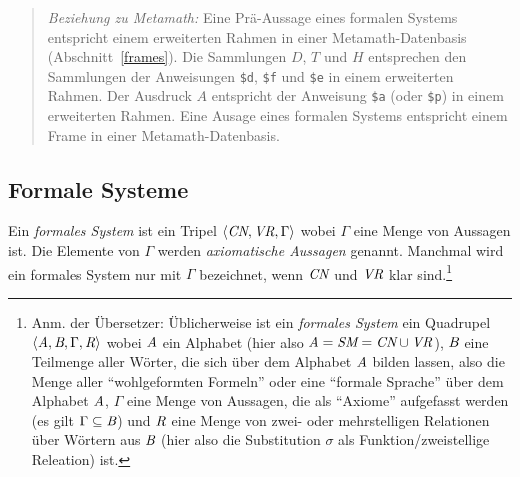 {\footnotesize\begin{quotation}
{\em Beziehung zu Metamath:} Eine Prä-Aussage eines formalen Systems entspricht einem erweiterten Rahmen in einer Metamath-Datenbasis (Abschnitt~\ref{frames}).  Die Sammlungen $D$, $T$ und $H$ entsprechen den Sammlungen der Anweisungen \texttt{\$d}, \texttt{\$f} und \texttt{\$e} in einem erweiterten Rahmen.  Der Ausdruck $A$ entspricht der Anweisung \texttt{\$a} (oder \texttt{\$p}) in einem erweiterten Rahmen.  Eine Ausage eines formalen Systems entspricht einem Frame in einer Metamath-Datenbasis.
\end{quotation}}

\subsection{Formale Systeme}

Ein {\em formales System} ist ein Tripel $\langle \mbox{\em CN},\mbox{\em VR},\Gamma\rangle$ wobei $\Gamma$ eine Menge von Aussagen ist.  Die Elemente von $\Gamma$ werden {\em axiomatische Aussagen} genannt.  Manchmal wird ein formales System nur mit $\Gamma$ bezeichnet, wenn $\mbox{\em CN}$ und $\mbox{\em VR}$ klar sind.\footnote{Anm. der Übersetzer: Üblicherweise ist ein {\em formales System} ein Quadrupel $\langle \mbox{\em A},\mbox{\em B},\Gamma,\mbox{\em R}\rangle$
wobei $\mbox{\em A}$ ein Alphabet (hier also $\mbox{\em A} = \mbox{\em SM} = \mbox{\em CN}\cup \mbox{\em VR}$),
$\mbox{\em B}$ eine Teilmenge aller Wörter, die sich über dem Alphabet $\mbox{\em A}$ bilden lassen, also die Menge aller "`wohlgeformten Formeln"' oder eine "`formale Sprache"' über dem Alphabet $\mbox{\em A}$,
$\Gamma$ eine Menge von Aussagen, die als "`Axiome"' aufgefasst werden (es gilt $\Gamma\subseteq\mbox{\em B}$) und 
$\mbox{\em R}$ eine Menge von zwei- oder mehrstelligen Relationen über Wörtern aus $\mbox{\em B}$ (hier also die Substitution $\sigma$ als Funktion/zweistellige Releation) ist.}

